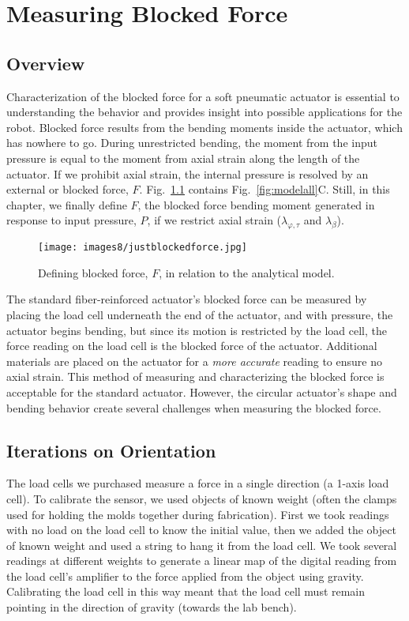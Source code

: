 \chapter{Measuring Blocked Force}
\label{chapter:blockedforce}

\section{Overview}
Characterization of the blocked force for a soft pneumatic actuator is essential to understanding the behavior and provides insight into possible applications for the robot. Blocked force results from the bending moments inside the actuator, which has nowhere to go. During unrestricted bending, the moment from the input pressure is equal to the moment from axial strain along the length of the actuator. If we prohibit axial strain, the internal pressure is resolved by an external or blocked force, $F$. Fig.~\ref{fig:justblockedforce} contains Fig.~\ref{fig:modelall}C. Still, in this chapter, we finally define $F$, the blocked force bending moment generated in response to input pressure, $P$, if we restrict axial strain ($\lambda_{\varphi,\tau}$ and $\lambda_\beta$). 

\begin{figure}[ht]
    \centering
     \texttt{[image: images8/justblockedforce.jpg]}
    \caption{Defining blocked force, $F$, in relation to the analytical model.}
    \label{fig:justblockedforce}
\end{figure}

The standard fiber-reinforced actuator's blocked force can be measured by placing the load cell underneath the end of the actuator, and with pressure, the actuator begins bending, but since its motion is restricted by the load cell, the force reading on the load cell is the blocked force of the actuator. Additional materials are placed on the actuator for a \emph{more accurate} reading to ensure no axial strain. This method of measuring and characterizing the blocked force is acceptable for the standard actuator. However, the circular actuator's shape and bending behavior create several challenges when measuring the blocked force. 

\section{Iterations on Orientation}

The load cells we purchased measure a force in a single direction (a 1-axis load cell). To calibrate the sensor, we used objects of known weight (often the clamps used for holding the molds together during fabrication). First we took readings with no load on the load cell to know the initial value, then we added the object of known weight and used a string to hang it from the load cell. We took several readings at different weights to generate a linear map of the digital reading from the load cell's amplifier to the force applied from the object using gravity. Calibrating the load cell in this way meant that the load cell must remain pointing in the direction of gravity (towards the lab bench). 

